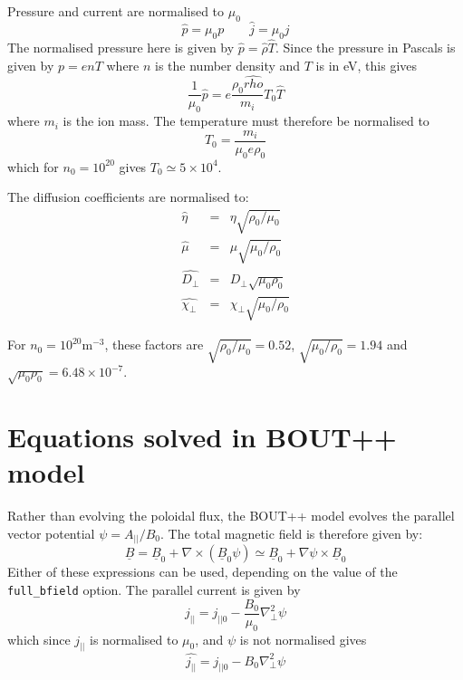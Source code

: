 \documentclass[12pt]{article}
\newcommand{\Bvec}{\ensuremath{\underline{B}}}
\begin{document}
Pressure and current are normalised to $\mu_0$
\[
\hat{p} = \mu_0 p \qquad \hat{j} = \mu_0 j
\]
The normalised pressure here is given by $\hat{p} = \hat{\rho}\hat{T}$.
Since the pressure in Pascals is given by $p = enT$ where $n$ is the number
density and $T$ is in eV, this gives
\[
\frac{1}{\mu_0}\hat{p} = e\frac{\rho_0\hat{rho}}{m_i} T_0\hat{T}
\]
where $m_i$ is the ion mass. The temperature must therefore be normalised to
\[
T_0 = \frac{m_i}{\mu_0 e \rho_0}
\]
which for $n_0=10^{20}$ gives $T_0\simeq 5\times 10^4$.

The diffusion coefficients are normalised to:
\begin{eqnarray*}
\hat{\eta} &=& \eta\sqrt{\rho_0 / \mu_0} \\
\hat{\mu} &=& \mu\sqrt{\mu_0/\rho_0} \\
\hat{D_\perp} &=& D_\perp\sqrt{\mu_0\rho_0} \\
\hat{\chi_\perp} &=& \chi_\perp\sqrt{\mu_0/\rho_0}
\end{eqnarray*}

For $n_0=10^{20}$m$^{-3}$, these factors are $\sqrt{\rho_0 / \mu_0} = 0.52$, $\sqrt{\mu_0/\rho_0}=1.94$ and $\sqrt{\mu_0\rho_0} = 6.48\times 10^{-7}$. 

\section{Equations solved in BOUT++ model}

Rather than evolving the poloidal flux, the BOUT++ model evolves
the parallel vector potential $\psi = A_{||} / B_0$. The total magnetic field
is therefore given by:
\[
\Bvec = \Bvec_0 + \nabla\times\left(\Bvec_0\psi\right) \simeq \Bvec_0 + \nabla\psi \times\Bvec_0
\]
Either of these expressions can be used, depending on the value of the \texttt{full\_bfield} option. The parallel current is given by
\[
j_{||} = j_{||0} - \frac{B_0}{\mu_0}\nabla_\perp^2\psi
\]
which since $j_{||}$ is normalised to $\mu_0$, and $\psi$ is not normalised gives
\[
\hat{j_{||}} = \hat{j_{||0}} - B_0\nabla_\perp^2\psi
\]
\end{document}
